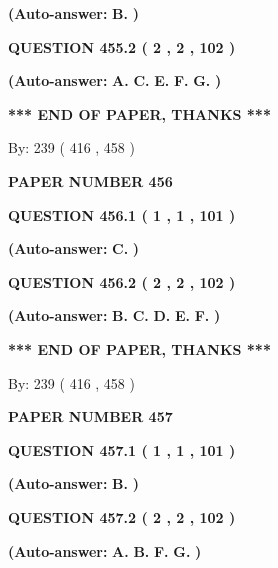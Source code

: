 \documentclass[12pt]{article}
\begin{document}
 
{\textbf{(Auto-answer:}}
{\textbf{\large{
B.}}}
{\textbf{)}}
 
 
  
  
{\textbf{\large{QUESTION
455.2 
 ( 2 , 2 , 102 )
}}}
 
 
{\textbf{(Auto-answer:}}
{\textbf{\large{
A.}}}
{\textbf{\large{
C.}}}
{\textbf{\large{
E.}}}
{\textbf{\large{
F.}}}
{\textbf{\large{
G.}}}
{\textbf{)}}
 
 
   
   
\vspace{1.0in} 
{\textbf{\large{ *** END OF PAPER, THANKS *** }}} 
   
   
\hspace{1.0in} By: 
 239 ( 416 ,  458 )
   
   
   
   
\newpage 
\setcounter{page}{ 
   456001 } 
   
   
 {\textbf{ \Large{ PAPER NUMBER  456  }}}
   
   
  
  
{\textbf{\large{QUESTION
456.1 
 ( 1 , 1 , 101 )
}}}
 
 
{\textbf{(Auto-answer:}}
{\textbf{\large{
C.}}}
{\textbf{)}}
 
 
  
  
{\textbf{\large{QUESTION
456.2 
 ( 2 , 2 , 102 )
}}}
 
 
{\textbf{(Auto-answer:}}
{\textbf{\large{
B.}}}
{\textbf{\large{
C.}}}
{\textbf{\large{
D.}}}
{\textbf{\large{
E.}}}
{\textbf{\large{
F.}}}
{\textbf{)}}
 
 
   
   
\vspace{1.0in} 
{\textbf{\large{ *** END OF PAPER, THANKS *** }}} 
   
   
\hspace{1.0in} By: 
 239 ( 416 ,  458 )
   
   
   
   
\newpage 
\setcounter{page}{ 
   457001 } 
   
   
 {\textbf{ \Large{ PAPER NUMBER  457  }}}
   
   
  
  
{\textbf{\large{QUESTION
457.1 
 ( 1 , 1 , 101 )
}}}
 
 
{\textbf{(Auto-answer:}}
{\textbf{\large{
B.}}}
{\textbf{)}}
 
 
  
  
{\textbf{\large{QUESTION
457.2 
 ( 2 , 2 , 102 )
}}}
 
 
{\textbf{(Auto-answer:}}
{\textbf{\large{
A.}}}
{\textbf{\large{
B.}}}
{\textbf{\large{
F.}}}
{\textbf{\large{
G.}}}
{\textbf{)}}
 
\end{document}
